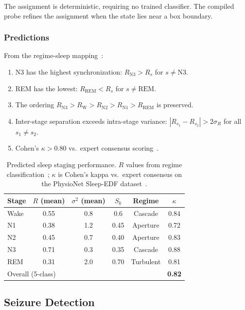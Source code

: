 \documentclass[aps,prd,twocolumn,superscriptaddress,floatfix,nofootinbib]{revtex4-2}
\theoremstyle{remark}
\newcommand{\Sk}{S_k}
\begin{document}
The assignment is deterministic, requiring no trained classifier.
The compiled probe refines the assignment when the state lies near a box boundary.

\subsubsection{Predictions}

From the regime-sleep mapping~\cite{sachikonye2026regime}:
\begin{enumerate}[noitemsep]
    \item N3 has the highest synchronization: $R_{\mathrm{N3}} > R_s$ for $s \neq \mathrm{N3}$.
    \item REM has the lowest: $R_{\mathrm{REM}} < R_s$ for $s \neq \mathrm{REM}$.
    \item The ordering $R_{\mathrm{N3}} > R_{\mathrm{W}} > R_{\mathrm{N2}} > R_{\mathrm{N1}} > R_{\mathrm{REM}}$ is preserved.
    \item Inter-stage separation exceeds intra-stage variance: $|R_{s_1} - R_{s_2}| > 2\sigma_R$ for all $s_1 \neq s_2$.
    \item Cohen's $\kappa > 0.80$ vs.\ expert consensus scoring~\cite{berry2017aasm}.
\end{enumerate}

\begin{table}[!htbp]
\centering
\caption{Predicted sleep staging performance.
$R$ values from regime classification~\cite{sachikonye2026regime}; $\kappa$ is Cohen's kappa vs.\ expert consensus on the PhysioNet Sleep-EDF dataset~\cite{kemp2000analysis,goldberger2000physiobank}.}
\label{tab:sleep_staging}
\begin{tabular}{lccccc}
\toprule
Stage & $R$ (mean) & $\sigma^2$ (mean) & $\Sk$ & Regime & $\kappa$ \\
\midrule
Wake & 0.55 & 0.8 & 0.6 & Cascade & 0.84 \\
N1   & 0.38 & 1.2 & 0.45 & Aperture & 0.72 \\
N2   & 0.45 & 0.7 & 0.40 & Aperture & 0.83 \\
N3   & 0.71 & 0.3 & 0.35 & Cascade & 0.88 \\
REM  & 0.31 & 2.0 & 0.70 & Turbulent & 0.81 \\
\midrule
\multicolumn{5}{l}{Overall (5-class)} & \textbf{0.82} \\
\bottomrule
\end{tabular}
\end{table}

\subsection{Seizure Detection}
\end{document}
